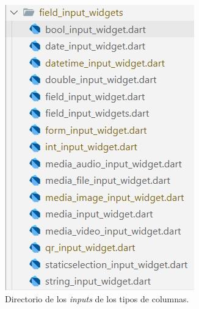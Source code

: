 \documentclass{article}
\begin{document}
\begin{figure}[H]
\begin{minipage}[b]{0.3\textwidth}
    \includegraphics[width=\textwidth]{images/field_inputs.jpg}
    \caption{Directorio de los \textit{inputs} de los tipos de columnas.}
    \label{fig:fieldinputs}
  \end{minipage}
  \hspace{0.02\textwidth}
  \begin{minipage}[b]{0.3\textwidth}
    \centering

\end{minipage}
\end{figure}
\end{document}
